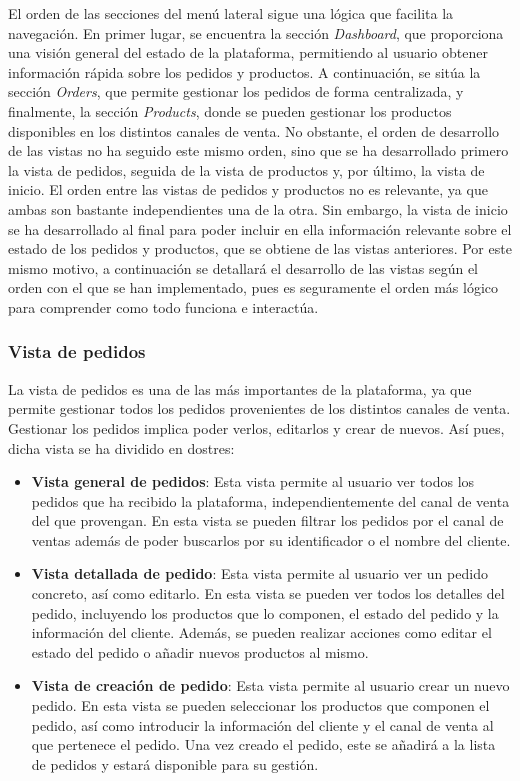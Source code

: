 El orden de las secciones del menú lateral sigue una lógica que facilita la navegación. En primer lugar, se encuentra la sección \textit{Dashboard}, que proporciona una visión general del estado de la plataforma, permitiendo al usuario obtener información rápida sobre los pedidos y productos. A continuación, se sitúa la sección \textit{Orders}, que permite gestionar los pedidos de forma centralizada, y finalmente, la sección \textit{Products}, donde se pueden gestionar los productos disponibles en los distintos canales de venta. No obstante, el orden de desarrollo de las vistas no ha seguido este mismo orden, sino que se ha desarrollado primero la vista de pedidos, seguida de la vista de productos y, por último, la vista de inicio. El orden entre las vistas de pedidos y productos no es relevante, ya que ambas son bastante independientes una de la otra. Sin embargo, la vista de inicio se ha desarrollado al final para poder incluir en ella información relevante sobre el estado de los pedidos y productos, que se obtiene de las vistas anteriores. Por este mismo motivo, a continuación se detallará el desarrollo de las vistas según el orden con el que se han implementado, pues es seguramente el orden más lógico para comprender como todo funciona e interactúa.

\subsubsection{Vista de pedidos}
\label{dev:subsubsec:vista_pedidos}

La vista de pedidos es una de las más importantes de la plataforma, ya que permite gestionar todos los pedidos provenientes de los distintos canales de venta. Gestionar los pedidos implica poder verlos, editarlos y crear de nuevos. Así pues, dicha vista se ha dividido en dostres:

\begin{itemize}
    \item \textbf{Vista general de pedidos}: Esta vista permite al usuario ver todos los pedidos que ha recibido la plataforma, independientemente del canal de venta del que provengan. En esta vista se pueden filtrar los pedidos por el canal de ventas además de poder buscarlos por su identificador o el nombre del cliente.
    \item \textbf{Vista detallada de pedido}: Esta vista permite al usuario ver un pedido concreto, así como editarlo. En esta vista se pueden ver todos los detalles del pedido, incluyendo los productos que lo componen, el estado del pedido y la información del cliente. Además, se pueden realizar acciones como editar el estado del pedido o añadir nuevos productos al mismo.
    \item \textbf{Vista de creación de pedido}: Esta vista permite al usuario crear un nuevo pedido. En esta vista se pueden seleccionar los productos que componen el pedido, así como introducir la información del cliente y el canal de venta al que pertenece el pedido. Una vez creado el pedido, este se añadirá a la lista de pedidos y estará disponible para su gestión.
\end{itemize}

